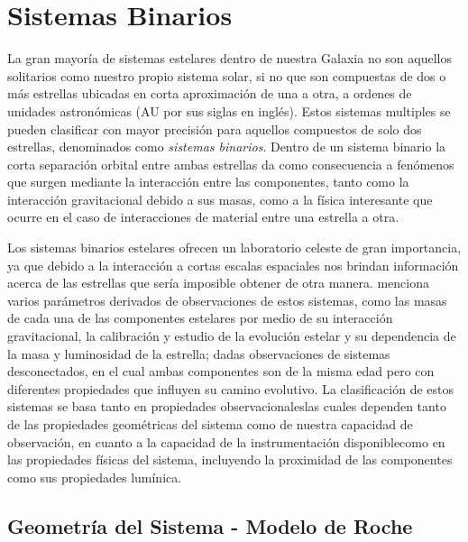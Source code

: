 \chapter{Sistemas Binarios}

La gran mayoría de sistemas estelares dentro de nuestra Galaxia no son aquellos
solitarios como nuestro propio sistema solar, si no que son compuestas de dos o
más estrellas ubicadas en corta aproximación de una a otra, a ordenes de
unidades astronómicas (AU por sus siglas en inglés). Estos sistemas multiples se
pueden clasificar con mayor precisión para aquellos compuestos de solo dos
estrellas, denominados como \textit{sistemas binarios}. Dentro de un sistema
binario la corta separación orbital entre ambas estrellas da como consecuencia a
fenómenos que surgen mediante la interacción entre las componentes, tanto como
la interacción gravitacional debido a sus masas, como a la física interesante
que ocurre en el caso de interacciones de material entre una estrella a otra. 

Los sistemas binarios estelares ofrecen un laboratorio celeste de gran
importancia, ya que debido a la interacción a cortas escalas espaciales nos
brindan información acerca de las estrellas que sería imposible obtener de otra
manera.  menciona varios
parámetros derivados de observaciones de estos sistemas, como las masas de cada
una de las componentes estelares por medio de su interacción gravitacional, la
calibración y estudio de la evolución estelar y su dependencia de la masa y
luminosidad de la estrella; dadas observaciones de sistemas desconectados, en el
cual ambas componentes son de la misma edad pero con diferentes propiedades que
influyen su camino evolutivo. La clasificación de estos sistemas se basa tanto
en propiedades observacionales\textemdash las cuales dependen tanto de las
propiedades geométricas del sistema como de nuestra capacidad de observación, en
cuanto a la capacidad de la instrumentación disponible\textemdash como en las
propiedades físicas del sistema, incluyendo la proximidad de las componentes
como sus propiedades lumínica.

\section{Geometría del Sistema - Modelo de Roche}


